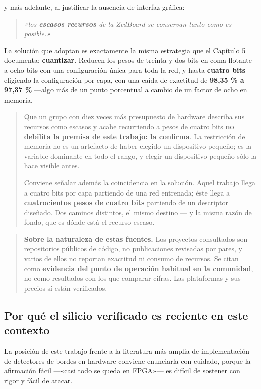 y más adelante, al justificar la ausencia de interfaz gráfica:

\begin{quote}
\emph{«los \textbf{escasos recursos} de la ZedBoard se conservan tanto
como es posible.»}
\end{quote}

La solución que adoptan es exactamente la misma estrategia que el
Capítulo 5 documenta: \textbf{cuantizar}. Reducen los pesos de treinta y
dos bits en coma flotante a ocho bits con una configuración única para
toda la red, y hasta \textbf{cuatro bits} eligiendo la configuración por
capa, con una caída de exactitud de \textbf{98,35 \% a 97,37 \%} ---algo
más de un punto porcentual a cambio de un factor de ocho en memoria.

\begin{quote}
Que un grupo con diez veces más presupuesto de hardware describa sus
recursos como escasos y acabe recurriendo a pesos de cuatro bits
\textbf{no debilita la premisa de este trabajo: la confirma}. La
restricción de memoria no es un artefacto de haber elegido un
dispositivo pequeño; es la variable dominante en todo el rango, y elegir
un dispositivo pequeño sólo la hace visible antes.

Conviene señalar además la coincidencia en la solución. Aquel trabajo
llega a cuatro bits por capa partiendo de una red entrenada; éste llega
a \textbf{cuatrocientos pesos de cuatro bits} partiendo de un descriptor
diseñado. Dos caminos distintos, el mismo destino --- y la misma razón
de fondo, que es dónde está el recurso escaso.
\end{quote}

\begin{quote}
\textbf{Sobre la naturaleza de estas fuentes.} Los proyectos consultados
son repositorios públicos de código, no publicaciones revisadas por
pares, y varios de ellos no reportan exactitud ni consumo de recursos.
Se citan como \textbf{evidencia del punto de operación habitual en la
comunidad}, no como resultados con los que comparar cifras. Las
plataformas y sus precios sí están verificados.
\end{quote}

\subsection{Por qué el silicio verificado es reciente en este
contexto}\label{por-quuxe9-el-silicio-verificado-es-reciente-en-este-contexto}

La posición de este trabajo frente a la literatura más amplia de
implementación de detectores de bordes en hardware conviene enunciarla
con cuidado, porque la afirmación fácil ---«casi todo se queda en
FPGA»--- es difícil de sostener con rigor y fácil de atacar.

